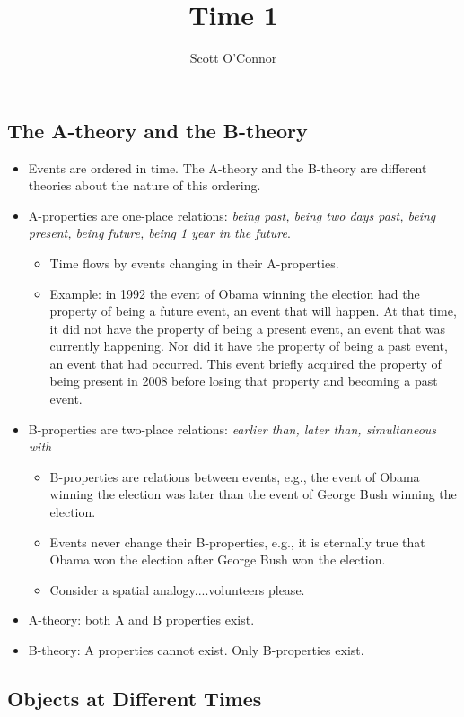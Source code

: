 \documentclass[oneside, 11]{article}
\begin{document}
\thispagestyle{fancy}
\title{Time 1}
\author{Scott O'Connor}




 

\subsection*{The A-theory and the B-theory}

\begin{itemize}
\item Events are ordered in time. The A-theory and the B-theory are different theories about the nature of this ordering. 
\item A-properties are one-place relations: \emph{being past, being two days past, being present, being future, being 1 year in the future}.
\begin{itemize}
\item Time flows by events changing in their A-properties. 
\item Example: in 1992 the event of Obama winning the election had the property of being a future event, an event that will happen. At that time, it did not have the property of being a present event, an event that was currently happening. Nor did it have the property of being a past event, an event that had occurred. This event briefly acquired the property of being present in 2008 before losing that property and becoming a past event. 
\end{itemize}
\item B-properties are two-place relations: \emph{earlier than, later than, simultaneous with}
\begin{itemize}
\item B-properties are relations between events, e.g., the event of Obama winning the election was later than the event of George Bush winning the election.
\item Events never change their B-properties, e.g., it is eternally true that Obama won the election after George Bush won the election.
\item Consider a spatial analogy....volunteers please.
\end{itemize}
\item A-theory: both A and B properties exist. 
\item B-theory: A properties cannot exist. Only B-properties exist. 
\end{itemize}

\subsection*{Objects at Different Times}
\end{document}
